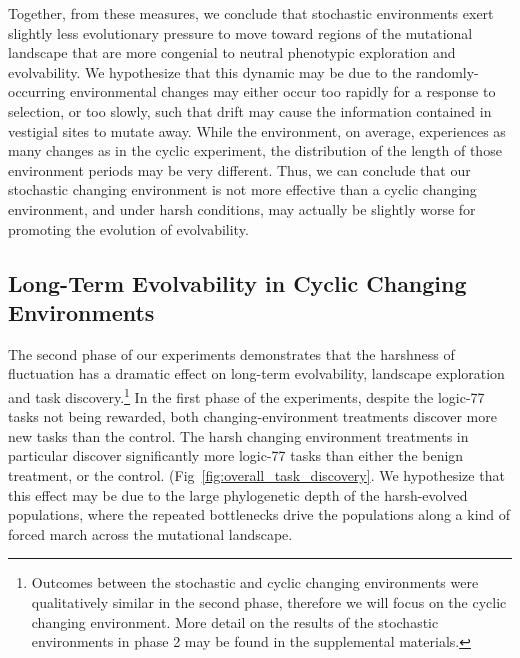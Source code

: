 \documentclass[PhD]{msu-thesis}
\begin{document}
Together, from these measures, we conclude that stochastic environments exert slightly less evolutionary pressure to move toward regions of the mutational landscape that are more congenial to neutral phenotypic exploration and evolvability. We hypothesize that this dynamic may be due to the randomly-occurring environmental changes may either occur too rapidly for a response to selection, or too slowly, such that drift may cause the information contained in vestigial sites to mutate away. While the environment, on average, experiences as many changes as in the cyclic experiment, the distribution of the length of those environment periods may be very different. Thus, we can conclude that our stochastic changing environment is not more effective than a cyclic changing environment, and under harsh conditions, may actually be slightly worse for promoting the evolution of evolvability.

\subsection{Long-Term Evolvability in Cyclic Changing Environments}
The second phase of our experiments demonstrates that the harshness of fluctuation has a dramatic effect on long-term evolvability, landscape exploration and task discovery.\footnote{Outcomes between the stochastic and cyclic changing environments were qualitatively similar in the second phase, therefore we will focus on the cyclic changing environment. More detail on the results of the stochastic environments in phase 2 may be found in the supplemental materials.} In the first phase of the experiments, despite the logic-77 tasks not being rewarded, both changing-environment treatments discover more new tasks than the control. The harsh changing environment treatments in particular discover significantly more logic-77 tasks than either the benign treatment, or the control. (Fig~\ref{fig:overall_task_discovery}. We hypothesize that this effect may be due to the large phylogenetic depth of the harsh-evolved populations, where the repeated bottlenecks drive the populations along a kind of forced march across the mutational landscape.
\end{document}
